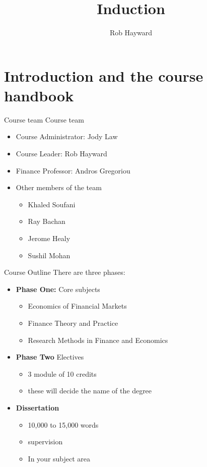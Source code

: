 \documentclass[14pt,xcolor=pdftex,dvipsnames,table]{beamer}\usepackage[]{graphicx}\usepackage[]{color}
\title{Induction}
\author{Rob Hayward}
\begin{document}
\begin{frame}
\titlepage
\end{frame}



\section{Introduction and the course handbook}
\begin{frame}{Course team}
Course team
\begin{itemize}[<+-| alert@+>]
\pause
\item Course Administrator: Jody Law
\item Course Leader: Rob Hayward
\item Finance Professor:  Andros Gregoriou
\item Other members of the team
\begin{itemize}
\item Khaled Soufani
\item Ray Bachan
\item Jerome Healy
\item Sushil Mohan
\end{itemize}
\end{itemize}
\end{frame}

\begin{frame}{Course Outline}
There are three phases:
\pause
\begin{itemize}[<+-| alert@+>]
\item \textbf{Phase One:} Core subjects
\begin{itemize}
\item Economics of Financial Markets
\item Finance Theory and Practice
\item Research Methods in Finance and Economics
\end{itemize}
\item \textbf{Phase Two} Electives
\begin{itemize}
\item 3 module of 10 credits
\item these will decide the name of the degree
\end{itemize}
\item \textbf{Dissertation}
\begin{itemize}
\item 10,000 to 15,000 words
\item supervision
\item In your subject area
\end{itemize}
\end{itemize}
\end{frame}
\end{document}
